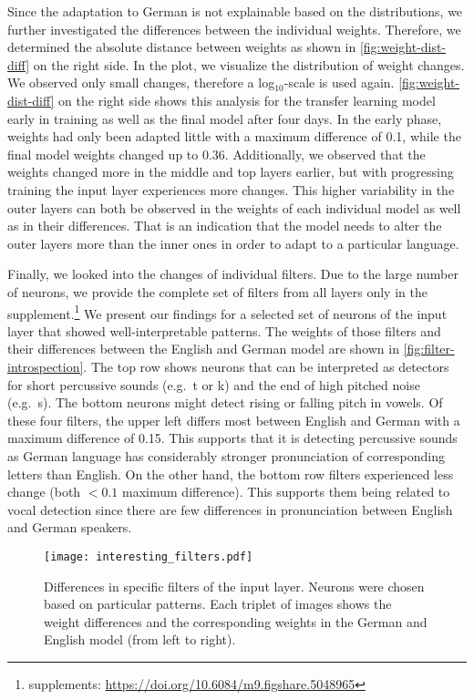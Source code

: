 \documentclass[11pt,a4paper]{article}
\begin{document}
Since the adaptation to German is not explainable based on the distributions, we further investigated the differences between the individual weights.
Therefore, we determined the absolute distance between weights as shown in \autoref{fig:weight-dist-diff} on the right side.
In the plot, we visualize the distribution of weight changes.
We observed only small changes, therefore a log$_{10}$-scale is used again.
\autoref{fig:weight-dist-diff} on the right side shows this analysis for the transfer learning model early in training as well as the final model after four days.
In the early phase, weights had only been adapted little with a maximum difference of 0.1, while the final model weights changed up to 0.36.
Additionally, we observed that the weights changed more in the middle and top layers earlier, but with progressing training the input layer experiences more changes.
This higher variability in the outer layers can both be observed in the weights of each individual model as well as in their differences.
That is an indication that the model needs to alter the outer layers more than the inner ones in order to adapt to a particular language. 

Finally, we looked into the changes of individual filters.
Due to the large number of neurons, we provide the complete set of filters from all layers only in the supplement.\footnote{supplements:
\href{https://doi.org/10.6084/m9.figshare.5048965}{https://doi.org/10.6084/m9.figshare.5048965}}
We present our findings for a selected set of neurons of the input layer that showed well-interpretable patterns.
The weights of those filters and their differences between the English and German model are shown in \autoref{fig:filter-introspection}.
The top row shows neurons that can be interpreted as detectors for short percussive sounds (e.g.~t or k) and the end of high pitched noise (e.g.~s).
The bottom neurons might detect rising or falling pitch in vowels.
Of these four filters, the upper left differs most between English and German with a maximum difference of 0.15.
This supports that it is detecting percussive sounds as German language has considerably stronger pronunciation of corresponding letters than English.
On the other hand, the bottom row filters experienced less change (both $<0.1$ maximum difference).
This supports them being related to vocal detection since there are few differences in pronunciation between English and German speakers.

\begin{figure}[h!]
  \texttt{[image: interesting\_filters.pdf]}
  \caption{Differences in specific filters of the input layer. Neurons were chosen based on particular patterns. Each triplet of images shows the weight differences and the corresponding weights in the German and English model (from left to right).}
  \label{fig:filter-introspection}
\end{figure}
\end{document}
